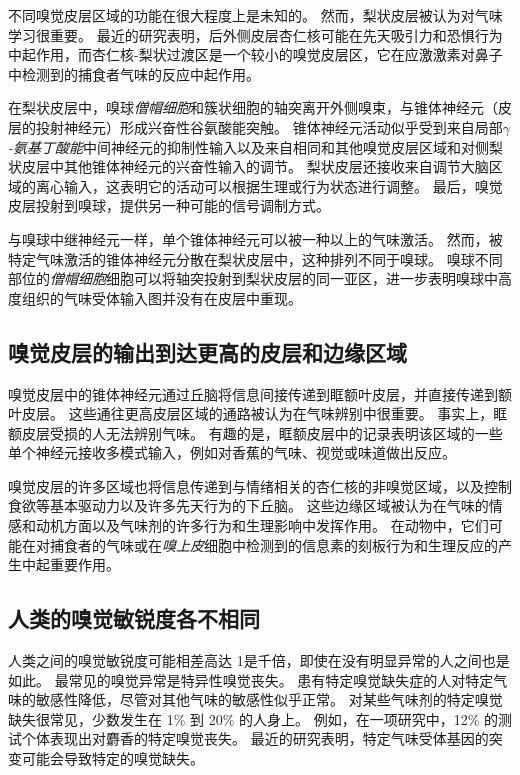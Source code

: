 不同嗅觉皮层区域的功能在很大程度上是未知的。
然而，梨状皮层被认为对气味学习很重要。
最近的研究表明，后外侧皮层杏仁核可能在先天吸引力和恐惧行为中起作用，而杏仁核-梨状过渡区是一个较小的嗅觉皮层区，它在应激激素对鼻子中检测到的捕食者气味的反应中起作用。


在梨状皮层中，嗅球\textit{僧帽细胞}和簇状细胞的轴突离开外侧嗅束，与锥体神经元（皮层的投射神经元）形成兴奋性谷氨酸能突触。
锥体神经元活动似乎受到来自局部\textit{$\gamma$-氨基丁酸能}中间神经元的抑制性输入以及来自相同和其他嗅觉皮层区域和对侧梨状皮层中其他锥体神经元的兴奋性输入的调节。
梨状皮层还接收来自调节大脑区域的离心输入，这表明它的活动可以根据生理或行为状态进行调整。
最后，嗅觉皮层投射到嗅球，提供另一种可能的信号调制方式。


与嗅球中继神经元一样，单个锥体神经元可以被一种以上的气味激活。
然而，被特定气味激活的锥体神经元分散在梨状皮层中，这种排列不同于嗅球。
嗅球不同部位的\textit{僧帽细胞}细胞可以将轴突投射到梨状皮层的同一亚区，进一步表明嗅球中高度组织的气味受体输入图并没有在皮层中重现。



\subsection{嗅觉皮层的输出到达更高的皮层和边缘区域}

嗅觉皮层中的锥体神经元通过丘脑将信息间接传递到眶额叶皮层，并直接传递到额叶皮层。
这些通往更高皮层区域的通路被认为在气味辨别中很重要。
事实上，眶额皮层受损的人无法辨别气味。
有趣的是，眶额皮层中的记录表明该区域的一些单个神经元接收多模式输入，例如对香蕉的气味、视觉或味道做出反应。


嗅觉皮层的许多区域也将信息传递到与情绪相关的杏仁核的非嗅觉区域，以及控制食欲等基本驱动力以及许多先天行为的下丘脑。
这些边缘区域被认为在气味的情感和动机方面以及气味剂的许多行为和生理影响中发挥作用。
在动物中，它们可能在对捕食者的气味或在\textit{嗅上皮}细胞中检测到的信息素的刻板行为和生理反应的产生中起重要作用。



\subsection{人类的嗅觉敏锐度各不相同}

人类之间的嗅觉敏锐度可能相差高达 1是千倍，即使在没有明显异常的人之间也是如此。
最常见的嗅觉异常是特异性嗅觉丧失。
患有特定嗅觉缺失症的人对特定气味的敏感性降低，尽管对其他气味的敏感性似乎正常。
对某些气味剂的特定嗅觉缺失很常见，少数发生在 1\% 到 20\% 的人身上。
例如，在一项研究中，12\% 的测试个体表现出对麝香的特定嗅觉丧失。
最近的研究表明，特定气味受体基因的突变可能会导致特定的嗅觉缺失。


